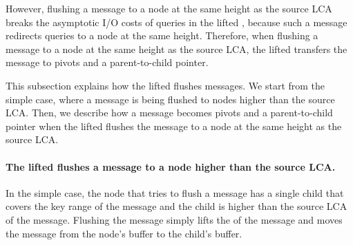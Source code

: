 However, flushing a \goto message to a node at the same height as the source
LCA breaks the asymptotic I/O costs of queries in the lifted \bedag,
because such a \goto message redirects queries to a node at the same height.
Therefore, when flushing a \goto message to a node at the same height as
the source LCA,
the lifted \bedag transfers the \goto message to
pivots and a parent-to-child pointer.

This subsection explains how the lifted \bedag flushes \goto messages.
We start from the simple case, where a \goto message is being flushed to nodes
higher than the source LCA.
Then, we describe how a \goto message becomes pivots and a parent-to-child
pointer
when the lifted \bedag flushes the \goto message to
a node at the same height as the source LCA.

\paragraph{The lifted \bedag flushes a \goto message to a node higher than
the source LCA.}
In the simple case, the node that tries to flush a \goto message has a single
child that covers the key range of the \goto message
and the child is higher than the source LCA of the \goto message.
Flushing the \goto message simply lifts the \dpre of the \goto message and moves
the \goto message from the node's buffer to the child's buffer.

